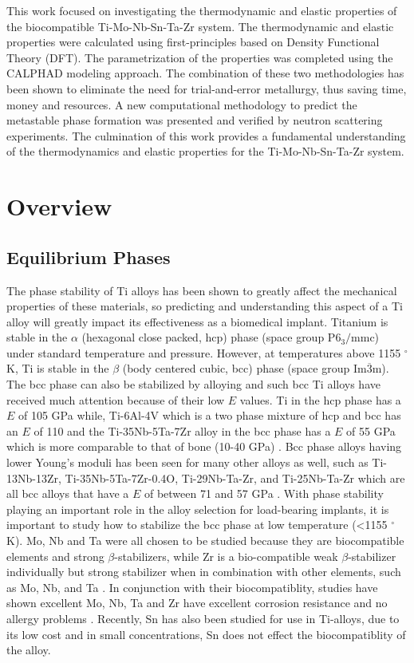 This work focused on investigating the thermodynamic and elastic properties of the biocompatible Ti-Mo-Nb-Sn-Ta-Zr system. The thermodynamic and elastic properties were calculated using first-principles based on Density Functional Theory (DFT). The parametrization of the properties was completed using the CALPHAD modeling approach. The combination of these two methodologies has been shown to eliminate the need for trial-and-error metallurgy, thus saving time, money and resources. A new computational methodology to predict the metastable phase formation was presented and verified by neutron scattering experiments. The culmination of this work provides a fundamental understanding of the thermodynamics and elastic properties for the Ti-Mo-Nb-Sn-Ta-Zr system. 


\section{Overview}

\subsection{Equilibrium Phases}

The phase stability of Ti alloys has been shown to greatly affect the mechanical properties of these materials, so predicting and understanding this aspect of a Ti alloy will greatly impact its effectiveness as a biomedical implant. Titanium is stable in the $\alpha$ (hexagonal close packed, hcp) phase (space group P$6_{3}/$mmc) under standard temperature and pressure. However, at temperatures above 1155 $^{\circ}$K, Ti is stable in the $\beta$ (body centered cubic, bcc) phase (space group Im$\overline{3}$m). The bcc phase can also be stabilized by alloying and such bcc Ti alloys have received much attention because of their low $E$ values. Ti in the hcp phase has a $E$ of 105 GPa while, Ti-6Al-4V which is a two phase mixture of hcp and bcc has an $E$ of 110 and the Ti-35Nb-5Ta-7Zr alloy in the bcc phase has a $E$ of 55 GPa which is more comparable to that of bone (10-40 GPa) \cite{Long1998a,Jain2013,Antolin2012,Mei2011,Brailovski2011b}. Bcc phase alloys having lower Young's moduli has been seen for many other alloys as well, such as Ti-13Nb-13Zr, Ti-35Nb-5Ta-7Zr-0.4O, Ti-29Nb-Ta-Zr, and Ti-25Nb-Ta-Zr which are all bcc alloys that have a $E$ of between 71 and 57 GPa \cite{Long1998a,Tane2008a,Tane2010a}. With phase stability playing an important role in the alloy selection for load-bearing implants, it is important to study how to stabilize the bcc phase at low temperature (<1155 $^{\circ}$K). Mo, Nb and Ta were all chosen to be studied because they are biocompatible elements and strong $\beta$-stabilizers, while Zr is a bio-compatible weak $\beta$-stabilizer individually but strong stabilizer when in combination with other elements, such as Mo, Nb, and Ta \cite{Long1998a}. In conjunction with their biocompatiblity, studies have shown excellent Mo, Nb, Ta and Zr have excellent corrosion resistance and no allergy problems \cite{Tane2008a}. Recently, Sn has also been studied for use in Ti-alloys, due to its low cost \cite{Niinomi2012} and in small concentrations, Sn does not effect the biocompatiblity of the alloy. 

